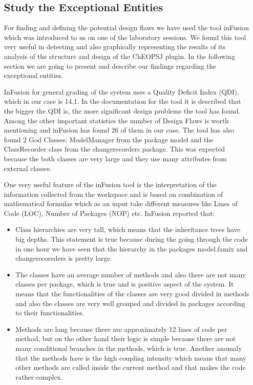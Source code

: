 \documentclass{article}
\begin{document}
\subsection{Study the Exceptional Entities}
For finding and defining the potential design flaws we have used the tool inFusion which was introduced to us on one of the laboratory sessions. We found this tool very useful in detecting and also graphically representing the results of its analysis of the structure and design of the ChEOPSJ plugin. In the following section we are going to present and describe our findings regarding the exceptional entities.

InFusion for general grading of the system uses a Quality Deficit Index (QDI), which in our case is 14.1. In the documentation for the tool it is described that the bigger the QDI is, the more significant design problems the tool has found. Among the other important statistics the number of Design Flaws is worth mentioning and inFusion has found 26 of them in our case. The tool has also found 2 God Classes: ModelManager from the package model and the ClassRecorder class from the changerecorders package. This was expected because the both classes are very large and they use many attributes from external classes.

One very useful feature of the inFusion tool is the interpretation of the information collected from the workspace and is based on combination of mathematical formulas which as an input take different measures like Lines of Code (LOC), Number of Packages (NOP) etc. InFusion reported that:

\begin{itemize}
  \item Class hierarchies are very tall, which means that the inheritance trees have big depths. This statement is true because during the going through the code in one hour we have seen that the hierarchy in the packages model.famix and changerecoreders is pretty large.
  \item The classes have an average number of methods and also there are not many classes per package, which is true and is positive aspect of the system. It means that the functionalities of the classes are very good divided in methods and also the classes are very well grouped and divided in packages according to their functionalities.
  \item Methods are long because there are approximately 12 lines of code per method, but on the other hand their logic is simple because there are not many conditional branches in the methods, which is true. Another anomaly that the methods have is the high coupling intensity which means that many other methods are called inside the current method and that makes the code rather complex.
\end{itemize}
\end{document}
